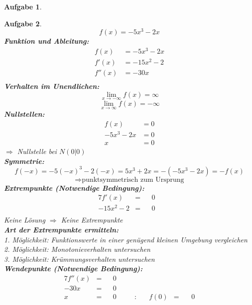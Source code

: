 \documentclass[12pt]{article}
\theoremstyle{note}
\newtheorem{aufgabe}{Aufgabe}
\begin{document}
\begin{flushleft}
\begin{aufgabe}
\end{aufgabe}\clearpage\begin{aufgabe} ~  
$$f(x)=- 5 x^{3} - 2 x$$ 
{\bf Funktion und Ableitung:} 
\begin{align*} 
f(x)&=- 5 x^{3} - 2 x\\ 
f'(x)&=- 15 x^{2} - 2\\ 
f''(x)&=- 30 x\\ 
\end{align*} 
{\bf Verhalten im Unendlichen:} 
\[ \lim_{x\rightarrow -\infty} f(x) =\infty\]\[ \lim_{x\rightarrow\infty} f(x) =-\infty\]{\bf Nullstellen:} 
\begin{align*} 
f(x)&=0 \\ 
- 5 x^{3} - 2 x&=0 \\ 
x&=0\end{align*} 
$\Rightarrow$ Nullstelle bei $N(0|0)$ \\ 
{\bf Symmetrie:} 
\[ f(-x)=- 5 (-x)^{3} - 2 (-x)=5 x^{3} + 2 x=-(- 5 x^{3} - 2 x)=-f(x) \]\[ \Rightarrow \text{punktsymmetrisch zum Ursprung} \]{\bf Extrempunkte (Notwendige Bedingung):} 
\begin{alignat*}{7} 
f'(x)&=& &0& \\ 
- 15 x^{2} - 2&=& &0& \\ 
\end{alignat*} 
Keine L\"osung $\Rightarrow$ Keine Extrempunkte \\ 
{\bf Art der Extrempunkte ermitteln:} \\[1em] 
{\em 1. M\"oglichkeit:} Funktionswerte in einer gen\"ugend kleinen Umgebung vergleichen \\ 
{\em 2. M\"oglichkeit:} Monotonieverhalten untersuchen \\ 
{\em 3. M\"oglichkeit:} Kr\"ummungsverhalten untersuchen \\ 
{\bf Wendepunkte (Notwendige Bedingung):} 
\begin{alignat*}{7} 
f''(x)&=& &0& \\ 
- 30 x&=& &0& \\ 
x&=& &0& \quad &:& \quad f(0)&=& \, &0\\ 
\end{alignat*} 


\end{aufgabe}
\end{flushleft}
\end{document}
